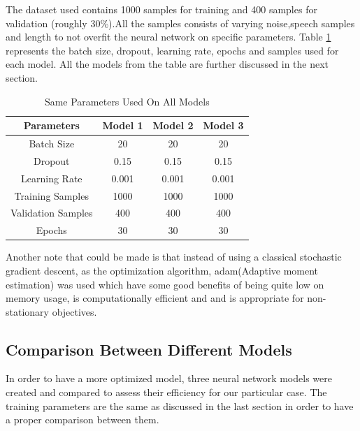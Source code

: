The dataset used contains 1000 samples for training and 400 samples for validation (roughly 30\%).All the samples consists of varying noise,speech samples and length to not overfit the neural network on specific parameters.
Table \ref{tab:firsttable} represents the batch size, dropout, learning rate, epochs and samples used for each model.
All the models from the table are further discussed in the next section.

\begin{table}[htp]
\centering
\begin{tabular}{|c|c|c|c|}
\hline
Parameters         & Model 1 & Model 2 & Model 3 \\ \hline
Batch Size         & 20      & 20      & 20      \\ \hline
Dropout            & 0.15    & 0.15    & 0.15    \\ \hline
Learning Rate      & 0.001   & 0.001   & 0.001   \\ \hline
Training Samples   & 1000    & 1000    & 1000    \\ \hline
Validation Samples & 400     & 400     & 400     \\ \hline
Epochs             & 30      & 30      & 30      \\ \hline
\end{tabular}
\caption{Same Parameters Used On All Models}
\label{tab:firsttable}
\end{table}
Another note that could be made is that instead of using a classical stochastic gradient descent, as the optimization algorithm, adam(Adaptive moment estimation) was used which have some good benefits of being quite low on memory usage, is computationally efficient and and is appropriate for non-stationary objectives.
\subsection{Comparison Between Different Models}

In order to have a more optimized model, three neural network models were created and compared to assess their efficiency for our particular case. The training parameters are the same as discussed  in the last section in order to have a proper comparison between them.


